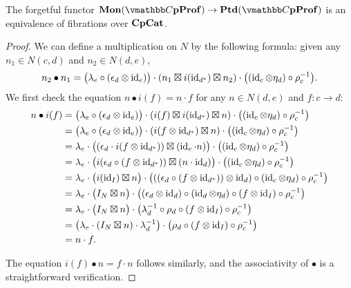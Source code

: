 \documentclass[11pt,oneside,article]{memoir}
\begin{document}
\begin{proposition}\label{prop:unit_implies_monoid}
   The forgetful functor $\Mon(\dCompProf)\to\Ptd(\dCompProf)$ is an equivalence of fibrations over $\mathbf{CpCat}$.
\end{proposition}
\begin{proof}
   We can define a multiplication on $N$ by the following formula: given any $n_1\in N(c,d)$ and $n_2\in N(d,e)$,
   \[
      n_2\bullet n_1 = \bigl(\lambda_e\circ(\epsilon_d\otimes\operatorname{id}_e)\bigr)\cdot(n_1\boxtimes i(\operatorname{id}_{d^*})\boxtimes n_2)\cdot\bigl((\operatorname{id}_c\otimes \eta_d)\circ\rho_c^{-1}\bigr).
   \]
   We first check the equation $n\bullet i(f)=n\cdot f$ for any $n\in N(d,e)$ and $f\colon c\to d$:
   \begin{align*}
      n\bullet i(f) &= \bigl(\lambda_e\circ(\epsilon_d\otimes\operatorname{id}_e)\bigr)\cdot(i(f)\boxtimes i(\operatorname{id}_{d^*})\boxtimes n)\cdot\bigl((\operatorname{id}_c\otimes \eta_d)\circ\rho_c^{-1}\bigr) \\
      &= \bigl(\lambda_e\circ(\epsilon_d\otimes\operatorname{id}_e)\bigr)\cdot(i(f\otimes\operatorname{id}_{d^*})\boxtimes n)\cdot\bigl((\operatorname{id}_c\otimes \eta_d)\circ\rho_c^{-1}\bigr) \\
      &= \lambda_e\cdot\bigl((\epsilon_d\cdot i(f\otimes \operatorname{id}_{d^*}))\boxtimes (\operatorname{id}_e\cdot n)\bigr)\cdot\bigl((\operatorname{id}_c\otimes \eta_d)\circ\rho_c^{-1}\bigr) \\
      &= \lambda_e\cdot\bigl(i(\epsilon_d\circ (f\otimes \operatorname{id}_{d^*}))\boxtimes (n\cdot\operatorname{id}_d)\bigr)\cdot\bigl((\operatorname{id}_c\otimes \eta_d)\circ\rho_c^{-1}\bigr) \\
      &= \lambda_e\cdot\bigl(i(\operatorname{id}_I)\boxtimes n\bigr)\cdot\bigl(((\epsilon_d\circ (f\otimes \operatorname{id}_{d^*}))\otimes\operatorname{id}_d)\circ(\operatorname{id}_c\otimes \eta_d)\circ\rho_c^{-1}\bigr) \\
      &= \lambda_e\cdot\bigl(I_N\boxtimes n\bigr)\cdot\bigl((\epsilon_d\otimes\operatorname{id}_d)\circ(\operatorname{id}_d\otimes\eta_d)\circ(f\otimes\operatorname{id}_I)\circ\rho_c^{-1}\bigr) \\
      &= \lambda_e\cdot\bigl(I_N\boxtimes n\bigr)\cdot\bigl(\lambda_d^{-1}\circ\rho_d\circ(f\otimes\operatorname{id}_I)\circ\rho_c^{-1}\bigr) \\
      &= \bigl(\lambda_e\cdot(I_N\boxtimes n)\cdot\lambda_d^{-1}\bigr)\cdot\bigl(\rho_d\circ(f\otimes\operatorname{id}_I)\circ\rho_c^{-1}\bigr) \\
      &= n\cdot f.
   \end{align*}

   The equation $i(f)\bullet n=f\cdot n$ follows similarly, and the associativity of $\bullet$ is a straightforward verification.


\end{proof}
\end{document}
